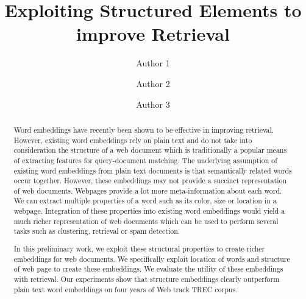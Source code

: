 \documentclass[runningheads,a4paper]{llncs}
\begin{document}
\mainmatter  %

\title{Exploiting Structured Elements to improve Retrieval}


%
%
\author{Author 1%
\and Author 2 \and Author 3}
%


%
%

\maketitle
\begin{abstract}
Word embeddings have recently been shown to be effective in improving retrieval. 
However, existing word embeddings rely on plain text and do not take into consideration the 
structure of a web document which is traditionally a popular means of extracting 
features for query-document matching. The underlying assumption of existing word embeddings 
from plain text documents is that semantically related words occur together. However, 
these embeddings may not provide a succinct representation of web documents. Webpages provide  
a lot more meta-information about each word. We can extract multiple properties of a word such 
as its color, size or location in a webpage. Integration of these properties into existing word 
embeddings would yield a much richer representation of web documents which can be used to perform 
several tasks such as clustering, retrieval or spam detection. 

In this preliminary work, we exploit these structural properties to create 
richer embeddings for web documents. We specifically exploit location of words and structure 
of web page to create these embeddings. We evaluate the utility of these embeddings with retrieval. 
Our experiments show that structure embeddings clearly outperform plain text word embeddings 
on four years of Web track TREC corpus. 
\end{abstract}
\end{document}
